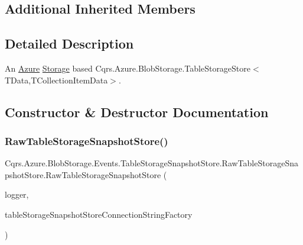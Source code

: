 \subsection*{Additional Inherited Members}


\subsection{Detailed Description}
An \hyperlink{namespaceCqrs_1_1Azure}{Azure} \hyperlink{namespaceCqrs_1_1Azure_1_1Storage}{Storage} based Cqrs.\+Azure.\+Blob\+Storage.\+Table\+Storage\+Store$<$\+T\+Data,\+T\+Collection\+Item\+Data$>$. 



\subsection{Constructor \& Destructor Documentation}
\mbox{\label{classCqrs_1_1Azure_1_1BlobStorage_1_1Events_1_1TableStorageSnapshotStore_1_1RawTableStorageSnapshotStore_a19d6dadf022ad205c9bf6e380f4da06e_a19d6dadf022ad205c9bf6e380f4da06e}} 
\subsubsection{\texorpdfstring{Raw\+Table\+Storage\+Snapshot\+Store()}{RawTableStorageSnapshotStore()}}
{\footnotesize\ttfamily Cqrs.\+Azure.\+Blob\+Storage.\+Events.\+Table\+Storage\+Snapshot\+Store.\+Raw\+Table\+Storage\+Snapshot\+Store.\+Raw\+Table\+Storage\+Snapshot\+Store (\begin{DoxyParamCaption}\item[{I\+Logger}]{logger,  }\item[{\hyperlink{interfaceCqrs_1_1Azure_1_1BlobStorage_1_1ITableStorageSnapshotStoreConnectionStringFactory}{I\+Table\+Storage\+Snapshot\+Store\+Connection\+String\+Factory}}]{table\+Storage\+Snapshot\+Store\+Connection\+String\+Factory }\end{DoxyParamCaption})}



